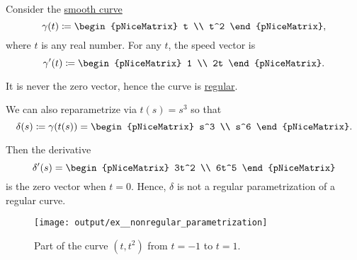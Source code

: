 \begin{example}\label{ex:nonregular_parametrization}
  Consider the \hyperref[def:smooth_curve]{smooth curve}
  \begin{equation*}
    \gamma(t)
    \coloneqq
    \begin{pNiceMatrix}
      t \\ t^2
    \end{pNiceMatrix},
  \end{equation*}
  where \( t \) is any real number. For any \( t \), the speed vector is
  \begin{equation*}
    \gamma'(t)
    \coloneqq
    \begin{pNiceMatrix}
      1 \\ 2t
    \end{pNiceMatrix}.
  \end{equation*}

  It is never the zero vector, hence the curve is \hyperref[def:regular_curve]{regular}.

  We can also reparametrize via \( t(s) = s^3 \) so that
  \begin{equation*}
    \delta(s)
    \coloneqq
    \gamma(t(s))
    =
    \begin{pNiceMatrix}
      s^3 \\ s^6
    \end{pNiceMatrix}.
  \end{equation*}

  Then the derivative
  \begin{equation*}
    \delta'(s)
    =
    \begin{pNiceMatrix}
      3t^2 \\ 6t^5
    \end{pNiceMatrix}
  \end{equation*}
  is the zero vector when \( t = 0 \). Hence, \( \delta \) is not a regular parametrization of a regular curve.

  \begin{figure}[!ht]
    \centering
    \texttt{[image: output/ex\_\_nonregular\_parametrization]}
    \caption{Part of the curve \( (t, t^2) \) from \( t = -1 \) to \( t = 1 \).}\label{fig:ex:nonregular_parametrization}
  \end{figure}
\end{example}

